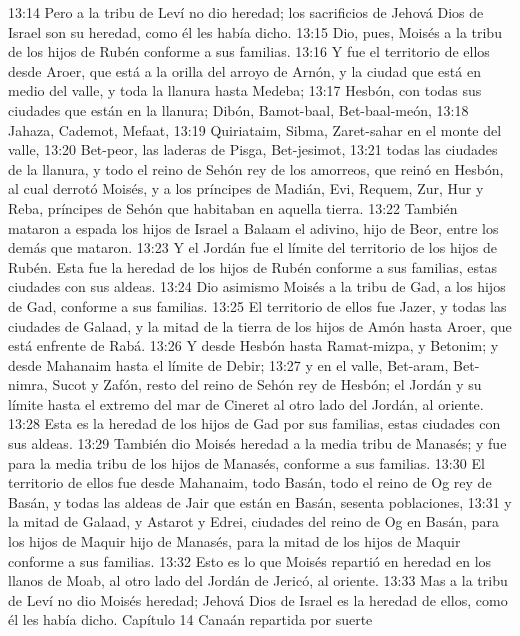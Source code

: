13:14 Pero a la tribu de Leví no dio heredad; los sacrificios de Jehová Dios de Israel son su heredad, como él les había dicho. 
13:15 Dio, pues, Moisés a la tribu de los hijos de Rubén conforme a sus familias.  
13:16 Y fue el territorio de ellos desde Aroer, que está a la orilla del arroyo de Arnón, y la ciudad que está en medio del valle, y toda la llanura hasta Medeba;  
13:17 Hesbón, con todas sus ciudades que están en la llanura; Dibón, Bamot-baal, Bet-baal-meón,  
13:18 Jahaza, Cademot, Mefaat,  
13:19 Quiriataim, Sibma, Zaret-sahar en el monte del valle,  
13:20 Bet-peor, las laderas de Pisga, Bet-jesimot,  
13:21 todas las ciudades de la llanura, y todo el reino de Sehón rey de los amorreos, que reinó en Hesbón, al cual derrotó Moisés, y a los príncipes de Madián, Evi, Requem, Zur, Hur y Reba, príncipes de Sehón que habitaban en aquella tierra.  
13:22 También mataron a espada los hijos de Israel a Balaam el adivino, hijo de Beor, entre los demás que mataron.  
13:23 Y el Jordán fue el límite del territorio de los hijos de Rubén. Esta fue la heredad de los hijos de Rubén conforme a sus familias, estas ciudades con sus aldeas.  
13:24 Dio asimismo Moisés a la tribu de Gad, a los hijos de Gad, conforme a sus familias.  
13:25 El territorio de ellos fue Jazer, y todas las ciudades de Galaad, y la mitad de la tierra de los hijos de Amón hasta Aroer, que está enfrente de Rabá.  
13:26 Y desde Hesbón hasta Ramat-mizpa, y Betonim; y desde Mahanaim hasta el límite de Debir;  
13:27 y en el valle, Bet-aram, Bet-nimra, Sucot y Zafón, resto del reino de Sehón rey de Hesbón; el Jordán y su límite hasta el extremo del mar de Cineret al otro lado del Jordán, al oriente.  
13:28 Esta es la heredad de los hijos de Gad por sus familias, estas ciudades con sus aldeas.  
13:29 También dio Moisés heredad a la media tribu de Manasés; y fue para la media tribu de los hijos de Manasés, conforme a sus familias.  
13:30 El territorio de ellos fue desde Mahanaim, todo Basán, todo el reino de Og rey de Basán, y todas las aldeas de Jair que están en Basán, sesenta poblaciones,  
13:31 y la mitad de Galaad, y Astarot y Edrei, ciudades del reino de Og en Basán, para los hijos de Maquir hijo de Manasés, para la mitad de los hijos de Maquir conforme a sus familias.  
13:32 Esto es lo que Moisés repartió en heredad en los llanos de Moab, al otro lado del Jordán de Jericó, al oriente.  
13:33 Mas a la tribu de Leví no dio Moisés heredad; Jehová Dios de Israel es la heredad de ellos, como él les había dicho. 
Capítulo 14
Canaán repartida por suerte  

